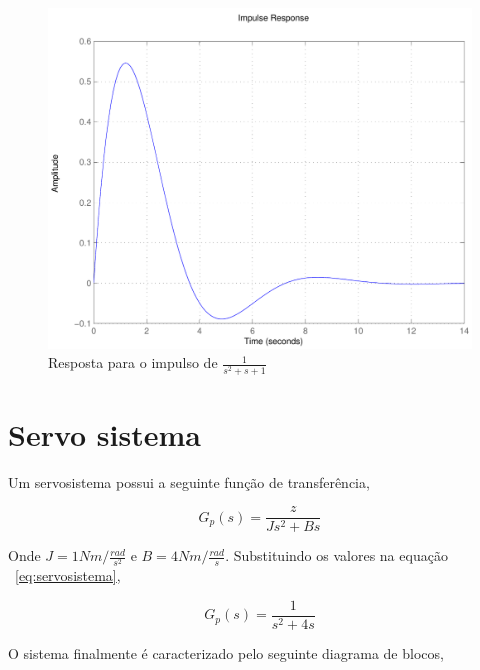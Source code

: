 \documentclass[paper=a4, fontsize=11pt]{article}
\begin{document}
\begin{figure}
    \begin{center}
    \includegraphics[scale=.5]{q3ia.pdf}
    \caption{Resposta para o impulso de $\frac{1}{s^2+s+1}$}
    \end{center}
\end{figure}


\section{Servo sistema}

Um servosistema possui a seguinte função de transferência,

\begin{equation} \label{eq:servosistema}
    G_p(s) = \frac{z}{J s^2 + B s}
\end{equation}

Onde $J=1 Nm/\frac{rad}{s^2}$ e $B = 4 Nm/\frac{rad}{s}$. Substituindo  os
valores na equação ~\ref{eq:servosistema},

\begin{equation} \label{eq:servosistema}
    G_p(s) = \frac{1}{s^2 + 4 s}
\end{equation}

O sistema finalmente é caracterizado pelo seguinte diagrama de blocos,

\begin{center}
\end{center}
\end{document}
